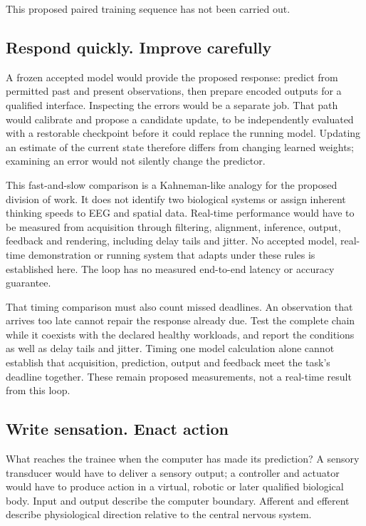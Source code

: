 This proposed paired training sequence has not been carried out.

\subsection{Respond quickly. Improve carefully}
A frozen accepted model would provide the proposed response: predict from
permitted past and present observations, then prepare encoded outputs for a
qualified interface. Inspecting the errors would be a separate job. That path
would calibrate and propose a candidate update, to be independently evaluated
with a restorable checkpoint before it could replace the running model.
Updating an estimate of the current state therefore differs from changing
learned weights; examining an error would not silently change the predictor.

This fast-and-slow comparison is a Kahneman-like analogy for the proposed division of work. It does not identify two biological systems or assign inherent thinking speeds to EEG and spatial data. Real-time performance would have to be measured from acquisition through filtering, alignment, inference, output, feedback and rendering, including delay tails and jitter. No accepted model, real-time demonstration or running system that adapts under these rules is established here. The loop has no measured end-to-end latency or accuracy guarantee.

That timing comparison must also count missed deadlines. An observation that
arrives too late cannot repair the response already due. Test the complete
chain while it coexists with the declared healthy workloads, and report the
conditions as well as delay tails and jitter. Timing one model calculation
alone cannot establish that acquisition, prediction, output and feedback meet
the task's deadline together. These remain proposed measurements, not a
real-time result from this loop.

\subsection{Write sensation. Enact action}
What reaches the trainee when the computer has made its prediction? A sensory
transducer would have to deliver a sensory output; a controller and actuator
would have to produce action in a virtual, robotic or later qualified biological
body. Input and output describe the computer boundary. Afferent and efferent
describe physiological direction relative to the central nervous system.

